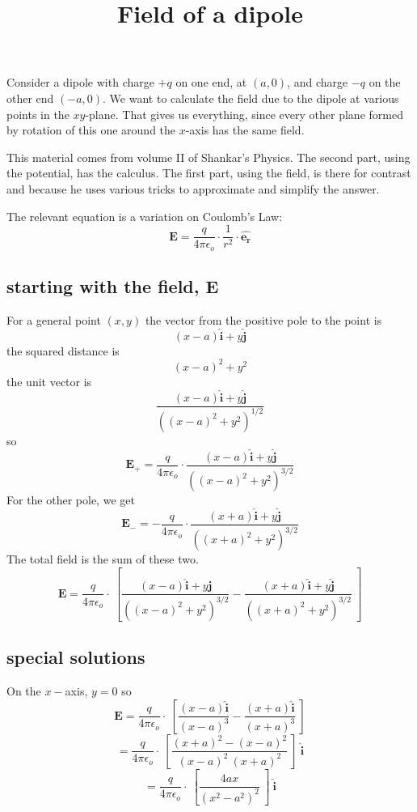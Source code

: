\documentclass[11pt, oneside]{article}
\title{Field of a dipole}
\date{}
\begin{document}
\maketitle
\Large

Consider a dipole with charge $+q$ on one end, at $(a,0)$, and charge $-q$ on the other end $(-a,0)$.  We want to calculate the field due to the dipole at various points in the $xy$-plane.  That gives us everything, since every other plane formed by rotation of this one around the $x$-axis has the same field.  

This material comes from volume II of Shankar's Physics.  The second part, using the potential, has the calculus.  The first part, using the field, is there for contrast and because he uses various tricks to approximate and simplify the answer.

The relevant equation is a variation on Coulomb's Law:
\[ \mathbf{E} = \frac{q}{4 \pi \epsilon_o} \cdot \frac{1}{r^2} \cdot \hat{\mathbf{e_r}} \]

\subsection*{starting with the field, E}

For a general point $(x,y)$ the vector from the positive pole to the point is
\[ (x - a) \hat{\mathbf{i}} + y \hat{\mathbf{j}} \]
the squared distance is
\[ (x - a)^2 + y^2 \]
the unit vector is
\[ \frac{(x - a) \hat{\mathbf{i}} + y \hat{\mathbf{j}}}{((x - a)^2 + y^2)^{1/2}} \]
so
\[ \mathbf{E}_+ = \frac{q}{4 \pi \epsilon_o} \cdot  \frac{ (x - a) \hat{\mathbf{i}} + y \hat{\mathbf{j}} }{((x - a)^2 + y^2)^{3/2}} \]
For the other pole, we get
\[ \mathbf{E}_- = - \frac{q}{4 \pi \epsilon_o} \cdot  \frac{(x + a) \hat{\mathbf{i}} + y \hat{\mathbf{j}}}{((x + a)^2 + y^2)^{3/2}} \]
The total field is the sum of these two.
\[ \mathbf{E} = \frac{q}{4 \pi \epsilon_o} \cdot \ [ \frac{(x - a) \hat{\mathbf{i}} + y \hat{\mathbf{j}} }{((x - a)^2 + y^2)^{3/2}} - \frac{(x + a) \hat{\mathbf{i}} + y \hat{\mathbf{j}} }{((x + a)^2 + y^2)^{3/2}} \ ] \]

\subsection*{special solutions}
On the $x-$axis, $y = 0$ so 
\[ \mathbf{E} = \frac{q}{4 \pi \epsilon_o} \cdot \ [ \frac{(x - a) \hat{\mathbf{i}}  }{(x - a)^3} - \frac{(x + a) \hat{\mathbf{i}} }{(x + a)^3} \ ] \]
\[ = \frac{q}{4 \pi \epsilon_o} \cdot \ [ \frac{(x + a)^2 - (x - a)^2}{(x - a)^2 \ (x + a)^2} \ ] \ \hat{\mathbf{i}} \]
\[ = \frac{q}{4 \pi \epsilon_o} \cdot \ [ \frac{4ax}{(x^2 - a^2)^2} \ ] \ \hat{\mathbf{i}} \]
\end{document}
